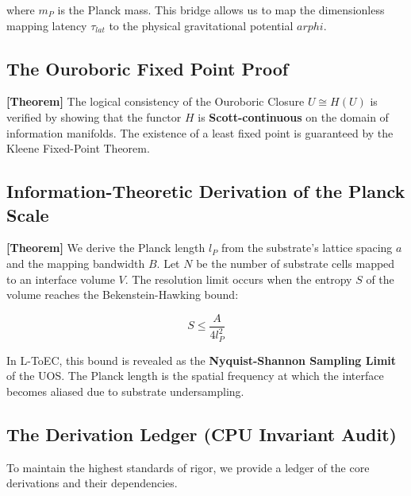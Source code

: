 \documentclass[11pt,titlepage]{article}
\newcommand{\tagtheo}{\textcolor{green!60!black}{\textbf{[Theorem]}} }
\begin{document}
where $m_P$ is the Planck mass. This bridge allows us to map the dimensionless mapping latency $\tau_{lat}$ to the physical gravitational potential $arphi$.

\subsection{The Ouroboric Fixed Point Proof}
\tagtheo The logical consistency of the Ouroboric Closure $U \cong H(U)$ is verified by showing that the functor $H$ is \textbf{Scott-continuous} on the domain of information manifolds. The existence of a least fixed point is guaranteed by the Kleene Fixed-Point Theorem.

\subsection{Information-Theoretic Derivation of the Planck Scale}
\tagtheo We derive the Planck length $l_P$ from the substrate's lattice spacing $a$ and the mapping bandwidth $B$. Let $N$ be the number of substrate cells mapped to an interface volume $V$. The resolution limit occurs when the entropy $S$ of the volume reaches the Bekenstein-Hawking bound:

\begin{equation}
S \le \frac{A}{4l_P^2}
\end{equation}

In L-ToEC, this bound is revealed as the \textbf{Nyquist-Shannon Sampling Limit} of the UOS. The Planck length is the spatial frequency at which the interface becomes aliased due to substrate undersampling.

\subsection{The Derivation Ledger (CPU Invariant Audit)}
To maintain the highest standards of rigor, we provide a ledger of the core derivations and their dependencies.
\end{document}
